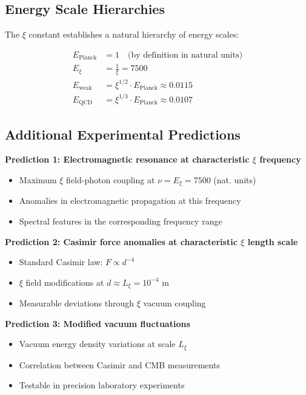 	\subsection{Energy Scale Hierarchies}
	
	The $\xi$ constant establishes a natural hierarchy of energy scales:
	
	\begin{align}
		E_{\text{Planck}} &= 1 \quad \text{(by definition in natural units)} \\
		E_\xi &= \frac{1}{\xi} = 7500 \\
		E_{\text{weak}} &= \xi^{1/2} \cdot E_{\text{Planck}} \approx 0.0115 \\
		E_{\text{QCD}} &= \xi^{1/3} \cdot E_{\text{Planck}} \approx 0.0107
	\end{align}
	
	\subsection{Additional Experimental Predictions}
	
	\textbf{Prediction 1: Electromagnetic resonance at characteristic $\xi$ frequency}
	\begin{itemize}
		\item Maximum $\xi$ field-photon coupling at $\nu = E_\xi = 7500$ (nat. units)
		\item Anomalies in electromagnetic propagation at this frequency
		\item Spectral features in the corresponding frequency range
	\end{itemize}
	
	\textbf{Prediction 2: Casimir force anomalies at characteristic $\xi$ length scale}
	\begin{itemize}
		\item Standard Casimir law: $F \propto d^{-4}$
		\item $\xi$ field modifications at $d \approx L_\xi = 10^{-4}$ m
		\item Measurable deviations through $\xi$ vacuum coupling
	\end{itemize}
	
	\textbf{Prediction 3: Modified vacuum fluctuations}
	\begin{itemize}
		\item Vacuum energy density variations at scale $L_\xi$
		\item Correlation between Casimir and CMB measurements
		\item Testable in precision laboratory experiments
	\end{itemize}
	
